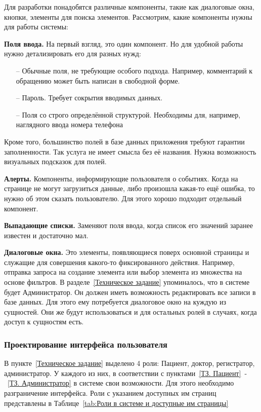 \documentclass[a4paper,article]{article}
\begin{document}
    Для разработки понадобятся различные компоненты, такие как диалоговые окна, кнопки, элементы для поиска элементов. Рассмотрим, какие компоненты нужны для работы системы:

    \textbf{Поля ввода.} На первый взгляд, это один компонент. Но для удобной работы нужно детализировать его для разных нужд:

    \begin{itemize}[nolistsep]
        \item[--] Обычные поля, не требующие особого подхода. Например, комментарий к обращению может быть написан в свободной форме.
        \item[--] Пароль. Требует сокрытия вводимых данных.
        \item[--] Поля со строго определённой структурой. Необходимы для, например, наглядного ввода номера телефона
    \end{itemize}

    Кроме того, большинство полей в базе данных приложения требуют гарантии заполненности. Так услуга не имеет смысла без её названия. Нужна возможность визуальных подсказок для полей.

    \textbf{Алерты.} Компоненты, информирующие пользователя о событиях. Когда на странице не могут загрузиться данные, либо произошла какая-то ещё ошибка, то нужно об этом сказать пользователю. Для этого хорошо подходит отдельный компонент.

    \textbf{Выпадающие списки.} Заменяют поля ввода, когда список его значений заранее известен и достаточно мал.

    \textbf{Диалоговые окна.} Это элементы, появляющиеся поверх основной страницы и служащие для совершения какого-то фиксированного действия. Например, отправка запроса на создание элемента или выбор элемента из множества на основе фильтров. В разделе~\ref{Техническое задание} упоминалось, что в системе будет Администратор. Он должен иметь возможность редактировать все записи в базе данных. Для этого ему потребуется диалоговое окно на куждую из сущностей. Они же будут использоваться и для остальных ролей в случаях, когда доступ к сущностям есть.

    \subsubsection{Проектирование интерфейса пользователя}

    В пункте~\ref{Техническое задание} выделено 4 роли: Пациент, доктор, регистратор, администратор. У каждого из них, в соответствии с пунктами~\ref{ТЗ. Пациент}~-~\ref{ТЗ. Администратор} в системе свои возможности. Для этого необходимо разграничение интерфейса. Роли с указанием доступных им страниц представлены в Таблице~\ref{tab:Роли в системе и доступные им страницы}
\end{document}
